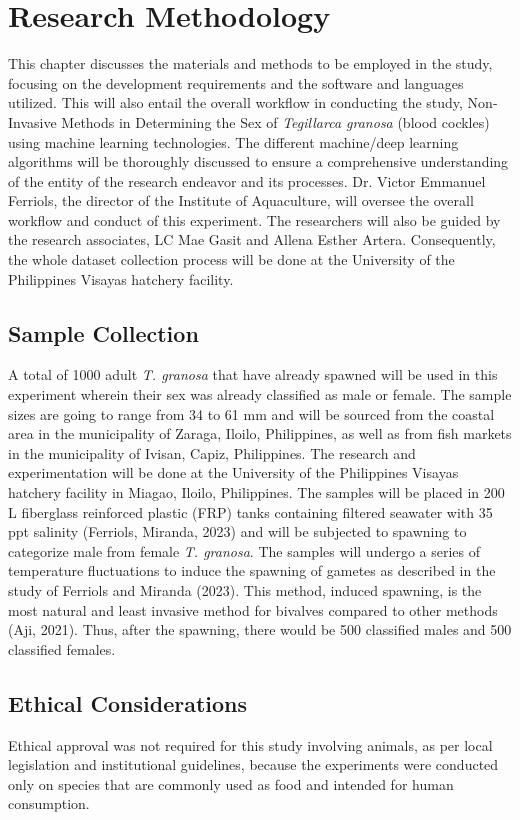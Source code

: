 \chapter{Research Methodology}

This chapter discusses the materials and methods to be employed in the study, focusing on the development requirements and the software and languages utilized. This will also entail the overall workflow in conducting the study, Non-Invasive Methods in Determining the Sex of \textit{Tegillarca granosa} (blood cockles) using machine learning technologies. The different machine/deep learning algorithms will be thoroughly discussed to ensure a comprehensive understanding of the entity of the research endeavor and its processes. 
Dr. Victor Emmanuel Ferriols, the director of the Institute of Aquaculture, will oversee the overall workflow and conduct of this experiment. The researchers will also be guided by the research associates, LC Mae Gasit and Allena Esther Artera. Consequently, the whole dataset collection process will be done at the University of the Philippines Visayas hatchery facility. 
\section{Sample Collection}
A total of 1000 adult \textit{T. granosa} that have already spawned will be used in this experiment wherein their sex was already classified as male or female. The sample sizes are going to range from 34 to 61 mm and will be sourced from the coastal area in the municipality of Zaraga, Iloilo, Philippines, as well as from fish markets in the municipality of Ivisan, Capiz, Philippines. The research and experimentation will be done at the University of the Philippines Visayas hatchery facility in Miagao, Iloilo, Philippines. The samples will be placed in 200 L fiberglass reinforced plastic (FRP) tanks containing filtered seawater with 35 ppt salinity (Ferriols, Miranda, 2023) and will be subjected to spawning to categorize male from female \textit{T. granosa}. The samples will undergo a series of temperature fluctuations to induce the spawning of gametes as described in the study of Ferriols and Miranda (2023). This method, induced spawning, is the most natural and least invasive method for bivalves compared to other methods (Aji, 2021). Thus, after the spawning, there would be 500 classified males and 500 classified females. 
\section{Ethical Considerations}
Ethical approval was not required for this study involving animals, as per local legislation and institutional guidelines, because the experiments were conducted only on species that are commonly used as food and intended for human consumption. 
